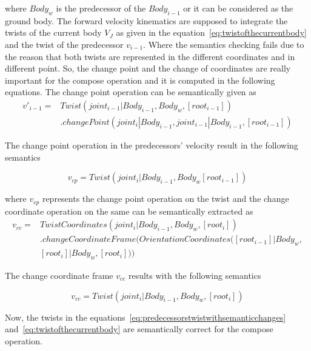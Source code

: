 where $Body_w$ is the predecessor of the $Body_{i-1}$ or it can be considered as the ground body. The forward velocity kinematics are supposed to integrate the twists of the current body $V_J$ as given in the equation~\eqref{eq:twistofthecurrentbody} and the twist of the predecessor $v_{i-1}$. Where the semantics checking fails due to the reason that both twists are represented in the different coordinates and in different point. So, the change point and the change of coordinates are really important for the compose operation and it is computed in the following equations. The change point operation can be semantically given as
\begin{equation}
\begin{aligned}
v'_{i-1} = {} & Twist(joint_{i-1}|Body_{i-1}, Body_w,  [root_{i-1}]) \\ 
& .changePoint(joint_i|Body_{i-1}, joint_{i-1}|Body_{i-1}, [root_{i-1}])
\end{aligned}
\end{equation}

The change point operation in the predecessors' velocity result in the following semantics

\begin{equation}
v_{cp} = Twist(joint_i | Body_{i-1}, Body_w [root_{i-1}])
\end{equation}

where $v_{cp}$ represents the change point operation on the twist and the change coordinate operation on the same can be semantically extracted as
\begin{equation}
\begin{aligned}
v_{cc} = {} & TwistCoordinates(joint_i|Body_{i-1}, Body_w, [root_i]) \\ & .changeCoordinateFrame(OrientationCoordinates([root_{i-1}]|Body_w, \\&[root_i]|Body_w, [root_i]))
\end{aligned}
\end{equation}

The change coordinate frame $v_{cc}$ results with the following semantics 

\begin{equation}
v_{cc} = Twist(joint_i | Body_{i-1}, Body_w, [root_i])
\label{eq:predecessorstwistwithsemanticchanges}
\end{equation}

Now, the twists in the equations~\eqref{eq:predecessorstwistwithsemanticchanges} and~\eqref{eq:twistofthecurrentbody} are semantically correct for the compose operation.

